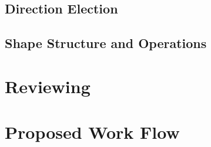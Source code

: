 \subsection{Direction Election}

\subsection{Shape Structure and Operations}




\section{Reviewing}

\section{Proposed Work Flow}


%

%

%

%

%

%

